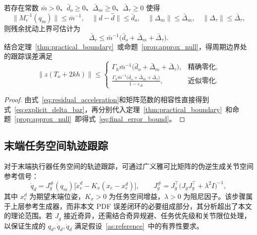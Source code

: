 \begin{corollary}[显式误差上界]\label{cor:explicit_bound}
  若存在常数 \(\bar m>0\)、\(\bar d_o\ge0\)、\(\bar\Delta_m\ge0\)、\(\bar\Delta_\tau\ge0\) 使得
  \[
  \|M_e^{-1}(q_m)\| \le \bar m^{-1},\quad
  \|d-\hat d\| \le \bar d_o,\quad
  \|\Delta_m\| \le \bar\Delta_m,\quad
  \|\Delta_\tau\| \le \bar\Delta_\tau,
  \]
  则残余扰动上界可估计为
  \begin{equation}
  \bar\Delta_r \le \bar m^{-1}\bigl(\bar d_o + \bar\Delta_m + \bar\Delta_\tau\bigr).
  \label{eq:explicit_delta_bar}
  \end{equation}
  结合定理~\ref{thm:practical_boundary}~或命题~\ref{prop:approx_null}，得周期边界处的跟踪误差满足
  \begin{equation}
  \|z(T_o+2kh)\| \le 
  \begin{cases}
  \Gamma_h \bar m^{-1}\bigl(\bar d_o + \bar\Delta_m + \bar\Delta_\tau\bigr), & \text{精确零化},\\[4pt]
  \displaystyle\frac{\Gamma_h \bar m^{-1}\bigl(\bar d_o + \bar\Delta_m + \bar\Delta_\tau\bigr)}{1-\varepsilon_\Delta}, & \text{近似零化}.
  \end{cases}
  \label{eq:final_error_bound}
  \end{equation}
\end{corollary}

\begin{proof}
  由式~\eqref{eq:residual_acceleration}和矩阵范数的相容性直接得到式~\eqref{eq:explicit_delta_bar}，再分别代入定理~\ref{thm:practical_boundary}~和命题~\ref{prop:approx_null}~即得式~\eqref{eq:final_error_bound}。
\end{proof}

\subsection{末端任务空间轨迹跟踪}

对于末端执行器任务空间的轨迹跟踪，可通过广义雅可比矩阵的伪逆生成关节空间参考信号：
\begin{equation}
\dot q_d = J_g^\#(q_m)\bigl[\dot x_e^d - K_x(x_e - x_e^d)\bigr],
\qquad
J_g^\# = J_g^\top\bigl(J_g J_g^\top + \lambda^2 I\bigr)^{-1},
\label{eq:task_space_velocity}
\end{equation}
其中 \(x_e^d\) 为期望末端位姿，\(K_x>0\) 为任务空间增益，\(\lambda>0\) 为阻尼因子。该步骤属于上层参考生成器，而非本文 PDF 误差闭环的必要组成部分，其分析超出了本文的理论范围。若 \(J_g\) 接近奇异，还需结合奇异规避、任务优先级和关节限位处理，以保证生成的 \(q_d,\dot q_d,\ddot q_d\) 满足假设~\ref{as:reference}~中的有界性要求。

